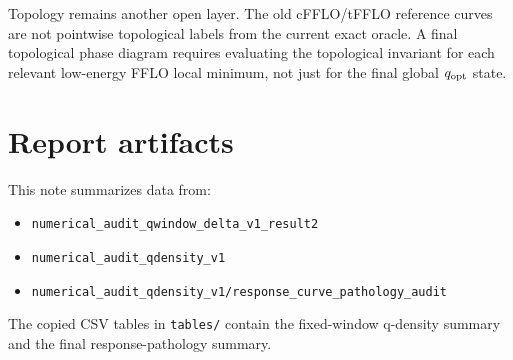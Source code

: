 \documentclass[11pt]{article}
\begin{document}
Topology remains another open layer.  The old cFFLO/tFFLO reference curves are
not pointwise topological labels from the current exact oracle.  A final
topological phase diagram requires evaluating the topological invariant for
each relevant low-energy FFLO local minimum, not just for the final global
\(q_{\rm opt}\) state.

\section*{Report artifacts}

This note summarizes data from:

\begin{itemize}
  \item \texttt{numerical\_audit\_qwindow\_delta\_v1\_result2}
  \item \texttt{numerical\_audit\_qdensity\_v1}
  \item \texttt{numerical\_audit\_qdensity\_v1/response\_curve\_pathology\_audit}
\end{itemize}

The copied CSV tables in \texttt{tables/} contain the fixed-window q-density
summary and the final response-pathology summary.
\end{document}
